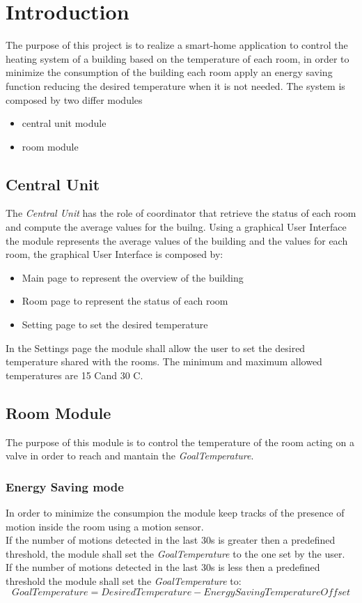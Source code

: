 \section{Introduction}
The purpose of this project is to realize a smart-home application to control the heating system of a building based on the temperature of each room, in order to minimize the consumption of the building each room apply an energy saving function reducing the desired temperature when it is not needed.
The system is composed by two differ modules
\begin{itemize}
	\item central unit module 
	\item room module
\end{itemize}

\subsection{Central Unit}
The \textit{Central Unit} has the role of coordinator that retrieve the status of each room and compute the average values for the builng.
Using a graphical User Interface the module represents the average values of the building and the values for each room, the graphical User Interface is composed by:
\begin{itemize}
	\item Main page to represent the overview of the building
	\item Room page to represent the status of each room
	\item Setting page to set the desired temperature
\end{itemize}
In the Settings page the module shall allow the user to set the desired temperature shared with the rooms.
The minimum and maximum allowed temperatures are 15 C\degree and 30 C\degree.

\subsection{Room Module}
The purpose of this module is to control the temperature of the room acting on a valve in order to 
reach and mantain the \textit{GoalTemperature}.

\subsubsection{Energy Saving mode}
In order to minimize the consumpion the module keep tracks of the presence of motion inside the room
using a motion sensor. \\
If the number of motions detected in the last 30s is greater then a predefined threshold, the module shall set the \textit{GoalTemperature} to the one set by the user. \\
If the number of motions detected in the last 30s is less then a predefined threshold the module shall set the \textit{GoalTemperature} to:
\begin{equation}
	GoalTemperature = DesiredTemperature - EnergySavingTemperatureOffset
\end{equation}

